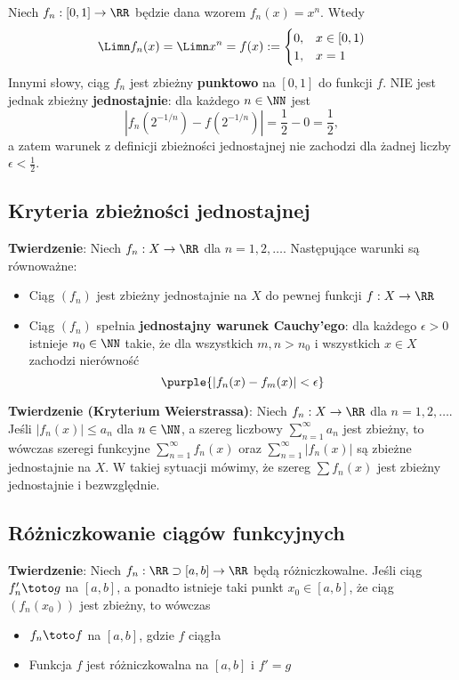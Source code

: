 \begin{example}
    Niech $f_n:[0,1]\to\RR$ będzie dana wzorem $f_n(x)=x^n$. Wtedy
    $$
    \Limn f_n(x) = \Limn x^n = f(x) := \begin{cases}
        0, & x\in[0,1) \\
        1, & x = 1
    \end{cases}
    $$
    Innymi słowy, ciąg $f_n$ jest zbieżny \textbf{punktowo} na $[0,1]$ do funkcji $f$. NIE jest jednak zbieżny \textbf{jednostajnie}: dla każdego $n\in\NN$ jest
    $$
    |f_n(2^{-1/n}) - f(2^{-1/n})| = \frac{1}{2} - 0 = \frac{1}{2},
    $$
    a zatem warunek z definicji zbieżności jednostajnej nie zachodzi dla żadnej liczby $\epsilon<\frac{1}{2}$.
\end{example}

\subsection{Kryteria zbieżności jednostajnej}
\textbf{Twierdzenie}:
Niech $f_n:X\to\RR$ dla $n=1,2,\ldots$. Następujące warunki są równoważne:
\begin{itemize}
    \item Ciąg $(f_n)$ jest zbieżny jednostajnie na $X$ do pewnej funkcji $f:X\to\RR$
    \item Ciąg $(f_n)$ spełnia \textbf{jednostajny warunek Cauchy'ego}: dla każdego $\epsilon>0$ istnieje $n_0\in\NN$ takie, że dla wszystkich $m,n>n_0$ i wszystkich $x\in X$ zachodzi nierówność
    $$\purple{|f_n(x)-f_m(x)|<\epsilon}$$
\end{itemize}

\textbf{Twierdzenie (Kryterium Weierstrassa)}:
Niech $f_n:X\to\RR$ dla $n=1,2,\ldots$. Jeśli $|f_n(x)|\leq a_n$ dla $n\in\NN$, a szereg liczbowy $\sum_{n=1}^\infty a_n$ jest zbieżny, to wówczas szeregi funkcyjne $\sum_{n=1}^\infty f_n(x)$ oraz $\sum_{n=1}^\infty |f_n(x)|$ są zbieżne jednostajnie na $X$. W takiej sytuacji mówimy, że szereg $\sum f_n(x)$ jest zbieżny jednostajnie i bezwzględnie.

\subsection{Różniczkowanie ciągów funkcyjnych}
\textbf{Twierdzenie}:
Niech $f_n:\RR\supset[a,b]\to\RR$ będą różniczkowalne. Jeśli ciąg $f_n'\toto g$ na $[a,b]$, a ponadto istnieje taki punkt $x_0\in[a,b]$, że ciąg $(f_n(x_0))$ jest zbieżny, to wówczas
\begin{itemize}
    \item $f_n\toto f$ na $[a,b]$, gdzie $f$ ciągła
    \item Funkcja $f$ jest różniczkowalna na $[a,b]$ i $f'=g$
\end{itemize}

